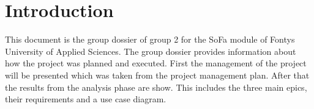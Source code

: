 \section{Introduction}
\label{sec:introduction}
This document is the group dossier of group 2 for the SoFa module of Fontys University of Applied Sciences. The group dossier provides information about how the project was planned and executed. 
\newline
First the management of the project will be presented which was taken from the project management plan. 
\newline
After that the results from the analysis phase are show. This includes the three main epics, their requirements and a use case diagram. 
\newline
